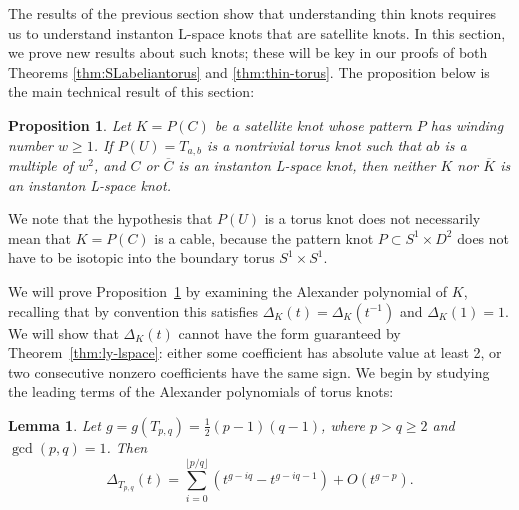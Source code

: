 \documentclass[11pt]{amsart}
\newtheorem {lemma}[theorem]{Lemma}
\newtheorem {proposition}[theorem]{Proposition}
\numberwithin{equation}{section}
\numberwithin{theorem}{section}
\theoremstyle{definition}
\newcommand{\mirror}[1]{\overline{#1}}
\begin{document}
The results of the previous section show that understanding thin knots requires us to understand instanton L-space knots that are satellite knots.  In this section, we prove new  results about such knots; these will be key in our proofs of both Theorems \ref{thm:SLabeliantorus} and \ref{thm:thin-torus}. The proposition below is the main technical result of this section:

\begin{proposition} \label{prop:torus-satellite-non-lspace}
Let $K = P(C)$ be a satellite knot whose pattern $P$ has winding number $w \geq 1$.  If $P(U) = T_{a,b}$ is a nontrivial torus knot such that $ab$ is a multiple of $w^2$, and $C$ or $\mirror{C}$ is an instanton L-space knot, then neither $K$ nor $\mirror{K}$ is an instanton L-space knot.
\end{proposition}

We note that the hypothesis that $P(U)$ is a torus knot does not necessarily mean that $K = P(C)$ is a cable, because the pattern knot $P \subset S^1\times D^2$ does not have to be isotopic into the boundary torus $S^1 \times S^1$.

We will prove Proposition~\ref{prop:torus-satellite-non-lspace} by examining the Alexander polynomial of $K$, recalling that by convention this satisfies $\Delta_K(t) = \Delta_K(t^{-1})$ and $\Delta_K(1) = 1$.  We will show that $\Delta_K(t)$ cannot have the form guaranteed by Theorem~\ref{thm:ly-lspace}: either some coefficient has absolute value at least 2, or two consecutive nonzero coefficients have the same sign.  We begin by studying the leading terms of the Alexander polynomials of torus knots:

\begin{lemma} \label{lem:torus-poly-leading}
Let $g = g(T_{p,q}) = \frac{1}{2}(p-1)(q-1)$, where $p > q \geq 2$ and $\gcd(p,q)=1$.  Then
\[ \Delta_{T_{p,q}}(t) = \sum_{i=0}^{\lfloor p/q\rfloor} (t^{g-iq} - t^{g-iq-1}) + O(t^{g-p}). \]
\end{lemma}
\end{document}

